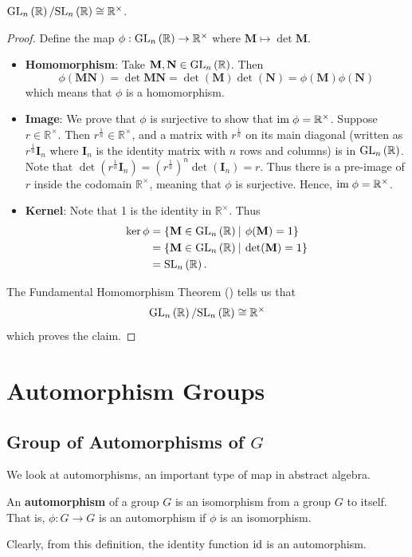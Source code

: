 \begin{proposition}
    $\mathrm{GL}_{n}\left(\mathbb{R}\right) / \mathrm{SL}_{n}\left(\mathbb{R}\right) \cong \mathbb{R}^\times$.
\end{proposition}
\begin{proof}
    Define the map $\phi: \mathrm{GL}_{n}\left(\mathbb{R}\right) \to \mathbb{R}^\times$ where $\textbf{M} \mapsto \det\textbf{M}$.
	\begin{itemize}
	    \item \textbf{Homomorphism}: Take $\textbf{M}, \textbf{N} \in \mathrm{GL}_{n}\left(\mathbb{R}\right)$. Then
	    \[
	        \phi(\textbf{MN}) = \det \textbf{MN} = \det(\textbf{M})\det(\textbf{N}) = \phi(\textbf{M})\phi(\textbf{N})
	    \]
	    which means that $\phi$ is a homomorphism.

	    \item \textbf{Image}: We prove that $\phi$ is surjective to show that $\mathrm{im}\; \phi = \mathbb{R}^\times$. Suppose $r \in \mathbb{R}^\times$. Then $r^{\frac1n} \in \mathbb{R}^\times$, and a matrix with $r^{\frac1n}$ on its main diagonal (written as $r^{\frac1n}\textbf{I}_n$ where $\textbf{I}_n$ is the identity matrix with $n$ rows and columns) is in $\mathrm{GL}_{n}\left(\mathbb{R}\right)$. Note that $\det\left(r^{\frac1n}\textbf{I}_n\right) = \left(r^{\frac1n}\right)^n\det(\textbf{I}_n) = r$. Thus there is a pre-image of $r$ inside the codomain $\mathbb{R}^\times$, meaning that $\phi$ is surjective. Hence, $\mathrm{im}\; \phi = \mathbb{R}^\times$.

	    \item \textbf{Kernel}: Note that 1 is the identity in $\mathbb{R}^\times$. Thus
	    \begin{align*}
	        \ker\phi &= \{\textbf{M} \in \GL{n}{\mathbb{R}} \vert \phi(\textbf{M}) = 1\} \\
	        &= \{\textbf{M} \in \GL{n}{\mathbb{R}} \vert \det(\textbf{M}) = 1\}\\
	        &= \SL{n}{\mathbb{R}}.
	    \end{align*}
	\end{itemize}
	The Fundamental Homomorphism Theorem () tells us that
	\[
	    \mathrm{GL}_{n}\left(\mathbb{R}\right) / \mathrm{SL}_{n}\left(\mathbb{R}\right) \cong \mathbb{R}^\times
	\]
	which proves the claim.
\end{proof}

\section{Automorphism Groups}
\subsection{Group of Automorphisms of \texorpdfstring{$G$}{G}}
We look at automorphisms, an important type of map in abstract algebra.
\begin{definition}
    An \textbf{automorphism} of a group $G$ is an isomorphism from a group $G$ to itself. That is, $\phi: G \to G$ is an automorphism if $\phi$ is an isomorphism.
\end{definition}
Clearly, from this definition, the identity function $\mathrm{id}$ is an automorphism.

